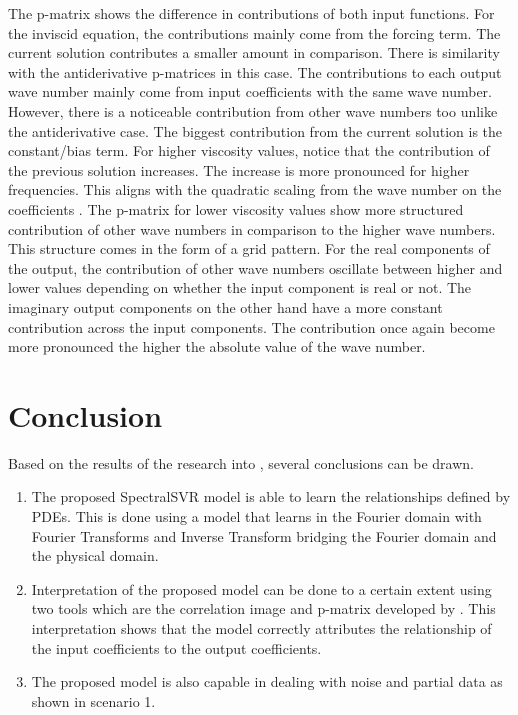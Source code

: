 \documentclass[preprint,12pt,times,authoryear]{elsarticle}
\begin{document}
The p-matrix shows the difference in contributions of both input functions. For the inviscid equation, the contributions mainly come from the forcing term. The current solution contributes a smaller amount in comparison. There is similarity with the antiderivative p-matrices in this case. The contributions to each output wave number mainly come from input coefficients with the same wave number. However, there is a noticeable contribution from other wave numbers too unlike the antiderivative case. The biggest contribution from the current solution is the constant/bias term. For higher viscosity values, notice that the contribution of the previous solution increases. The increase is more pronounced for higher frequencies. This aligns with the quadratic scaling from the wave number on the coefficients \citep{canutoSpectralMethodsEvolution2007}. The p-matrix for lower viscosity values show more structured contribution of other wave numbers in comparison to the higher wave numbers. This structure comes in the form of a grid pattern. For the real components of the output, the contribution of other wave numbers oscillate between higher and lower values depending on whether the input component is real or not. The imaginary output components on the other hand have a more constant contribution across the input components. The contribution once again become more pronounced the higher the absolute value of the wave number.
\section{Conclusion}
\noindent Based on the results of the research into \MakeLowercase{\judul}, several conclusions can be drawn.
\begin{enumerate}
  \item The proposed SpectralSVR model is able to learn the relationships defined by PDEs. This is done using a model that learns in the Fourier domain with Fourier Transforms and Inverse Transform bridging the Fourier domain and the physical domain.
  \item Interpretation of the proposed model can be done to a certain extent using two tools which are the correlation image and p-matrix developed by \citet{ustunVisualisationInterpretationSupport2007}. This interpretation shows that the model correctly attributes the relationship of the input coefficients to the output coefficients.
  \item The proposed model is also capable in dealing with noise and partial data as shown in scenario 1.
\end{enumerate}
\end{document}
